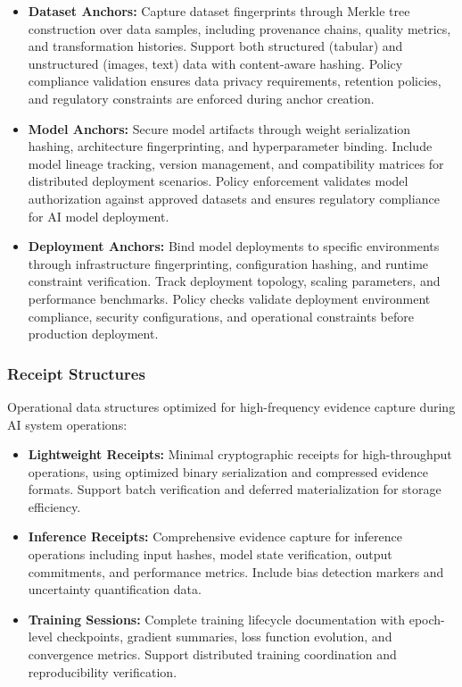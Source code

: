 \documentclass[12pt,a4paper]{article}
\begin{document}
\begin{itemize}
    \item \textbf{Dataset Anchors:} Capture dataset fingerprints through Merkle tree construction over data samples, including provenance chains, quality metrics, and transformation histories. Support both structured (tabular) and unstructured (images, text) data with content-aware hashing. Policy compliance validation ensures data privacy requirements, retention policies, and regulatory constraints are enforced during anchor creation.
    
    \item \textbf{Model Anchors:} Secure model artifacts through weight serialization hashing, architecture fingerprinting, and hyperparameter binding. Include model lineage tracking, version management, and compatibility matrices for distributed deployment scenarios. Policy enforcement validates model authorization against approved datasets and ensures regulatory compliance for AI model deployment.
    
    \item \textbf{Deployment Anchors:} Bind model deployments to specific environments through infrastructure fingerprinting, configuration hashing, and runtime constraint verification. Track deployment topology, scaling parameters, and performance benchmarks. Policy checks validate deployment environment compliance, security configurations, and operational constraints before production deployment.
\end{itemize}

\subsubsection{Receipt Structures}

Operational data structures optimized for high-frequency evidence capture during AI system operations:

\begin{itemize}
    \item \textbf{Lightweight Receipts:} Minimal cryptographic receipts for high-throughput operations, using optimized binary serialization and compressed evidence formats. Support batch verification and deferred materialization for storage efficiency.
    
    \item \textbf{Inference Receipts:} Comprehensive evidence capture for inference operations including input hashes, model state verification, output commitments, and performance metrics. Include bias detection markers and uncertainty quantification data.
    
    \item \textbf{Training Sessions:} Complete training lifecycle documentation with epoch-level checkpoints, gradient summaries, loss function evolution, and convergence metrics. Support distributed training coordination and reproducibility verification.
\end{itemize}
\end{document}
